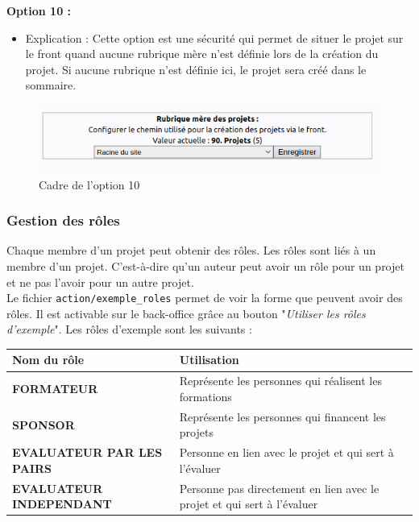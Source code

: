 \textbf{Option 10 :} 
\begin{itemize}
    \item Explication : Cette option est une sécurité qui permet de situer le projet sur le front quand aucune rubrique mère n'est définie lors de la création du projet. Si aucune rubrique n'est définie ici, le projet sera créé dans le sommaire.
\end{itemize}
\vspace{0.5cm}
\begin{figure}[h]
    \centering
    \includegraphics[trim=0 0 0 0, clip, width=1\textwidth]{./images/c10.png}
    \caption{Cadre de l'option 10}
    \label{option10}
\end{figure}

\newpage

\subsubsection*{Gestion des rôles} \label{subsubsection:gestion-roles}

Chaque membre d'un projet peut obtenir des rôles. Les rôles sont liés à un membre d'un projet. C'est-à-dire qu'un auteur peut avoir un rôle pour un projet et ne pas l'avoir pour un autre projet.\\
\newline
Le fichier \texttt{action/exemple\_roles} permet de voir la forme que peuvent avoir des rôles. Il est activable sur le back-office grâce au bouton "\textit{Utiliser les rôles d'exemple}". Les rôles d'exemple sont les suivants :


\vspace{0.5cm}

\begin{tabular}{|>{\centering\arraybackslash}m{6.2cm}|>{\centering\arraybackslash}m{6cm}|}
    \hline
    \rowcolor{lightgray} 
    Nom du rôle & Utilisation \\ 
    \hline
    \textbf{FORMATEUR} & Représente les personnes qui réalisent les formations \\ 
    \hline
    \textbf{SPONSOR} & Représente les personnes qui financent les projets \\ 
    \hline
    \textbf{EVALUATEUR PAR LES PAIRS} & Personne en lien avec le projet et qui sert à l'évaluer \\ 
    \hline
    \textbf{EVALUATEUR INDEPENDANT} & Personne pas directement en lien avec le projet et qui sert à l'évaluer \\ 
    \hline
\end{tabular}

